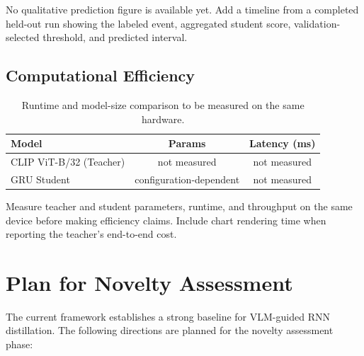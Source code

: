\documentclass[10pt,twocolumn]{article}
\begin{document}
No qualitative prediction figure is available yet. Add a timeline from a completed held-out run showing the labeled event, aggregated student score, validation-selected threshold, and predicted interval.

\subsection{Computational Efficiency}

\begin{table}[H]
\centering
\caption{Runtime and model-size comparison to be measured on the same hardware.}
\small
\begin{tabular}{lcc}
\toprule
\textbf{Model} & \textbf{Params} & \textbf{Latency (ms)} \\
\midrule
CLIP ViT-B/32 (Teacher) & not measured & not measured \\
GRU Student & configuration-dependent & not measured \\
\bottomrule
\end{tabular}
\label{tab:efficiency}
\end{table}

Measure teacher and student parameters, runtime, and throughput on the same device before making efficiency claims. Include chart rendering time when reporting the teacher's end-to-end cost.

\section{Plan for Novelty Assessment}

The current framework establishes a strong baseline for VLM-guided RNN distillation. The following directions are planned for the novelty assessment phase:
\end{document}
